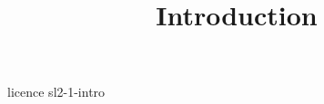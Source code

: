 \documentclass {beamer}
\title {Introduction}
\begin{document}
 {licence}
 {sl2-1-intro}
\end{document}
